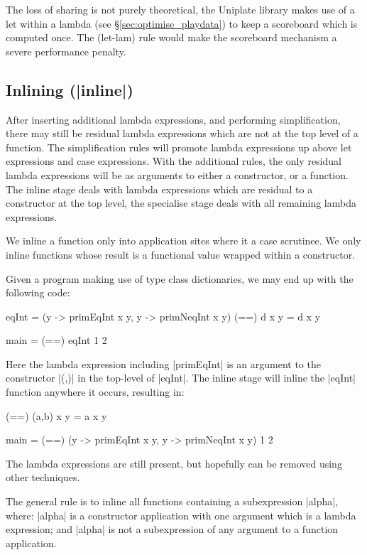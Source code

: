 \documentclass[preprint]{sigplanconf}
\begin{document}
The loss of sharing is not purely theoretical, the Uniplate library \cite{uniplate} makes use of a let within a lambda (see \S\ref{sec:optimise_playdata}) to keep a scoreboard which is computed once. The (let-lam) rule would make the scoreboard mechanism a severe performance penalty.

\subsection{Inlining (|inline|)}

After inserting additional lambda expressions, and performing simplification, there may still be residual lambda expressions which are not at the top level of a function. The simplification rules will promote lambda expressions up above let expressions and case expressions. With the additional rules, the only residual lambda expressions will be as arguments to either a constructor, or a function. The inline stage deals with lambda expressions which are residual to a constructor at the top level, the specialise stage deals with all remaining lambda expressions.

We inline a function only into application sites where it a case scrutinee. We only inline functions whose result is a functional value wrapped within a constructor.

\begin{example}
Given a program making use of type class dictionaries, we may end up with the following code:

\begin{code}
eqInt = (\x y -> primEqInt x y, \x y -> primNeqInt x y)
(==) d x y = d x y

main = (==) eqInt 1 2
\end{code}

Here the lambda expression including |primEqInt| is an argument to the constructor |(,)| in the top-level of |eqInt|. The inline stage will inline the |eqInt| function anywhere it occurs, resulting in:

\begin{code}
(==) (a,b) x y = a x y

main = (==) (\x y -> primEqInt x y, \x y -> primNeqInt x y) 1 2
\end{code}

The lambda expressions are still present, but hopefully can be removed using other techniques.
\end{example}

The general rule is to inline all functions containing a subexpression |alpha|, where: |alpha| is a constructor application with one argument which is a lambda expression; and |alpha| is not a subexpression of any argument to a function application.
\end{document}
